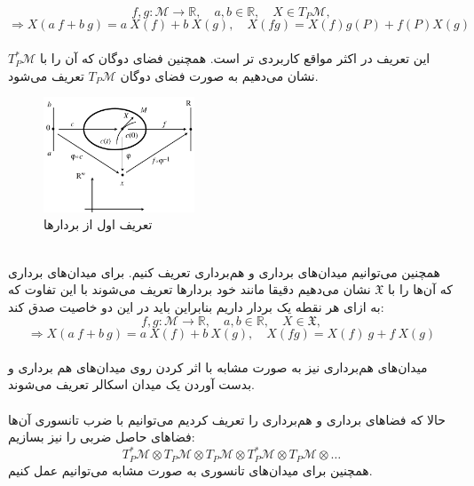 \begin{equation}
    f,g:\mathcal M\longrightarrow\mathbb{R},\quad a,b\in \mathbb{R},\quad X\in T_P\mathcal{M},
\end{equation}
\begin{equation}
    \Longrightarrow X(a\ f+b\ g)=a\ X(f)+b\ X(g),\quad X(fg)=X(f)g(P)+f(P)X(g)
\end{equation}\\
این تعریف در اکثر مواقع کاربردی تر است. همچنین فضای دوگان که آن را با $T_P^*\mathcal{M}$ نشان می‌دهیم به صورت فضای دوگان $T_P\mathcal{M}$ تعریف می‌شود.\\
\begin{figure}[h!]
    \centering
    \includegraphics[width=0.4\textwidth]{Pictures/Q2/3.png}
    \caption{تعریف اول از بردارها}
\end{figure}\\
همچنین می‌توانیم میدان‌های برداری و هم‌برداری تعریف کنیم. برای میدان‌های برداری که آن‌ها را با $\mathfrak{X}$ نشان می‌دهیم دقیقا مانند خود بردارها تعریف می‌شوند با این تفاوت که به ازای هر نقطه یک بردار داریم بنابراین باید در این دو خاصیت صدق کند:
\begin{equation}
    f,g:\mathcal M\longrightarrow\mathbb{R},\quad a,b\in \mathbb{R},\quad X\in \mathfrak{X},
\end{equation}
\begin{equation}
    \Longrightarrow X(a\ f+b\ g)=a\ X(f)+b\ X(g),\quad X(fg)=X(f)\ g+f\ X(g)
\end{equation}\\
میدان‌های هم‌برداری نیز به صورت مشابه با اثر کردن روی میدان‌های هم برداری و بدست آوردن یک میدان اسکالر تعریف می‌شوند.\\
\\
حالا که فضاهای برداری و هم‌برداری را تعریف کردیم می‌توانیم با ضرب تانسوری آن‌ها فضاهای حاصل ضربی را نیز بسازیم:
$$T_P^*\mathcal{M}\otimes T_P\mathcal{M}\otimes T_P \mathcal{M} \otimes T_P^* \mathcal{M} \otimes T_P\mathcal{M}\otimes\dots$$
همچنین برای میدان‌های تانسوری به صورت مشابه می‌توانیم عمل کنیم.\\
\\
